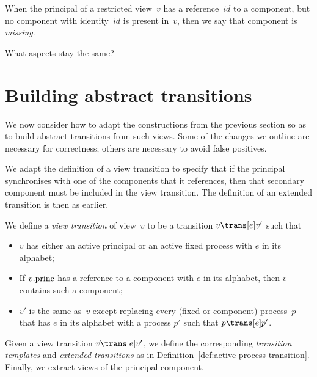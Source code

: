 When the principal of a restricted view~$v$ has a reference~$id$ to a
component, but no  component with identity~$id$ is present in~$v$, then we
say that component is \emph{missing}.

  What aspects stay the same?  


\section{Building abstract transitions}

We now consider how to adapt the constructions from the previous section so as
to build abstract transitions from such views.  Some of the changes we outline
are necessary for correctness; others are necessary to avoid false positives.




We adapt the definition of a view transition to specify that if the principal
synchronises with one of the components that it references, then that
secondary component must be included in the view transition.  The definition
of an extended transition is then as earlier. 
%
\begin{definition}
\label{def:active-process-transition-singleRef}
We define a \emph{view transition} of view~$v$ to be a transition $v \trans[e]
v'$ such that
%
\begin{itemize}
\item $v$ has either an active principal or an active fixed process with $e$
  in its alphabet;

\item If $v.\mathrm{princ}$ has a reference to a component with $e$ in its alphabet,
  then $v$ contains such a component;

\item $v'$ is the same as~$v$ except replacing every (fixed or component)
  process~$p$ that has $e$ in its alphabet with a process $p'$ such that \( p
  \trans[e] p' \).
\end{itemize}

Given a view transition $v \trans[e] v'$, we define the corresponding
\emph{transition templates} and \emph{extended transitions} as in
Definition~\ref{def:active-process-transition}.  Finally, we extract views of
the principal component.
\end{definition}

